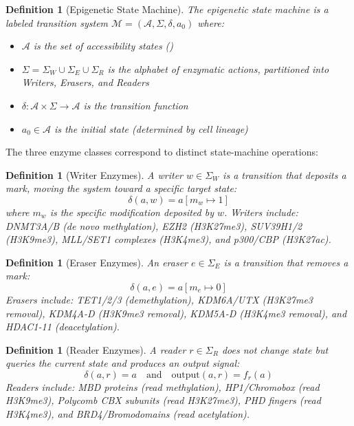 \documentclass[12pt,a4paper]{article}
\newtheorem{definition}[theorem]{Definition}
\begin{document}
\begin{definition}[Epigenetic State Machine]
\label{def:epi-sm}
The \emph{epigenetic state machine} is a labeled transition system $\mathcal{M} = (\mathcal{A}, \Sigma, \delta, a_0)$ where:
\begin{itemize}
    \item $\mathcal{A}$ is the set of accessibility states ()
    \item $\Sigma = \Sigma_W \cup \Sigma_E \cup \Sigma_R$ is the alphabet of enzymatic actions, partitioned into Writers, Erasers, and Readers
    \item $\delta : \mathcal{A} \times \Sigma \to \mathcal{A}$ is the transition function
    \item $a_0 \in \mathcal{A}$ is the initial state (determined by cell lineage)
\end{itemize}
\end{definition}

The three enzyme classes correspond to distinct state-machine operations:

\begin{definition}[Writer Enzymes]
\label{def:writers}
A \emph{writer} $w \in \Sigma_W$ is a transition that deposits a mark, moving the system toward a specific target state:
\[
    \delta(a, w) = a[m_w \mapsto 1]
\]
where $m_w$ is the specific modification deposited by $w$. Writers include: DNMT3A/B (de novo methylation), EZH2 (H3K27me3), SUV39H1/2 (H3K9me3), MLL/SET1 complexes (H3K4me3), and p300/CBP (H3K27ac).
\end{definition}

\begin{definition}[Eraser Enzymes]
\label{def:erasers}
An \emph{eraser} $e \in \Sigma_E$ is a transition that removes a mark:
\[
    \delta(a, e) = a[m_e \mapsto 0]
\]
Erasers include: TET1/2/3 (demethylation), KDM6A/UTX (H3K27me3 removal), KDM4A-D (H3K9me3 removal), KDM5A-D (H3K4me3 removal), and HDAC1-11 (deacetylation).
\end{definition}

\begin{definition}[Reader Enzymes]
\label{def:readers}
A \emph{reader} $r \in \Sigma_R$ does not change state but queries the current state and produces an output signal:
\[
    \delta(a, r) = a \quad \text{and} \quad \mathrm{output}(a, r) = f_r(a)
\]
Readers include: MBD proteins (read methylation), HP1/Chromobox (read H3K9me3), Polycomb CBX subunits (read H3K27me3), PHD fingers (read H3K4me3), and BRD4/Bromodomains (read acetylation).
\end{definition}
\end{document}
